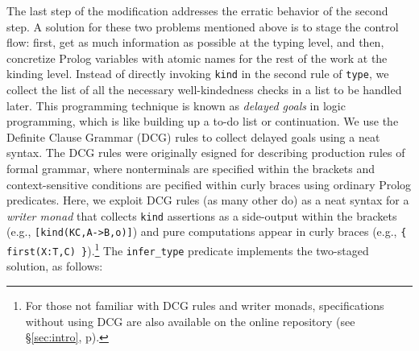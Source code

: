 \documentclass[runningheads,a4paper]{llncs}
\begin{document}
The last step of the modification addresses the erratic behavior of
the second step. A solution for these two problems mentioned above is
to stage the control flow: first, get as much information as possible
at the typing level, and then, concretize Prolog variables with atomic names
for the rest of the work at the kinding level. Instead of directly invoking
\verb|kind| in the second rule of \verb|type|, we collect the list of
all the necessary well-kindedness checks in a list to be handled later.
This programming technique is known as \emph{delayed goals}
in logic programming, which is like building up a to-do list or continuation.
We use the Definite Clause Grammar (DCG) rules \cite{SWIPrologManual}
to collect delayed goals using a neat syntax. The DCG rules were originally
esigned for describing production rules of formal grammar, where nonterminals
are specified within the brackets and context-sensitive conditions are
pecified within curly braces using ordinary Prolog predicates. Here,
we exploit DCG rules (as many other do) as a neat syntax for
a \emph{writer monad} that collects \texttt{kind} assertions
as a side-output within the brackets (e.g., \verb|[kind(KC,A->B,o)]|) and pure
computations appear in curly braces (e.g., \verb|{ first(X:T,C) }|).\footnote{
  For those not familiar with DCG rules and writer monads,
  specifications without using DCG are also available on the online repository
  (see \S\ref{sec:intro}, p\pageref{githubURL}). }
The \verb|infer_type| predicate implements the two-staged solution,
as follows:
\end{document}

